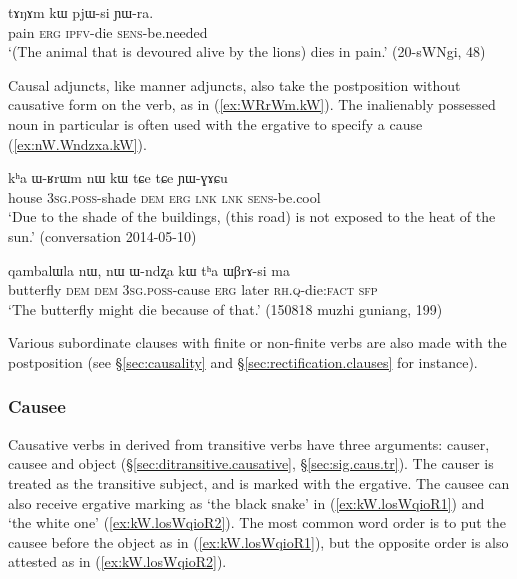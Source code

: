 \begin{exe}
\ex \label{ex:tANAm.kW.pjWsi}
 \gll tɤŋɤm kɯ pjɯ-si ɲɯ-ra. \\
 pain \textsc{erg} \textsc{ipfv}-die \textsc{sens}-be.needed \\
 \glt `(The animal that is devoured alive by the lions) dies in pain.' (20-sWNgi, 48)
\end{exe}

Causal adjuncts, like manner adjuncts, also take the postposition  without causative form on the verb, as in (\ref{ex:WRrWm.kW}). The inalienably possessed noun  in particular is often used with the ergative to specify a cause  (\ref{ex:nW.Wndzxa.kW}). 

\begin{exe}
\ex \label{ex:WRrWm.kW}
 \gll   kʰa ɯ-ʁrɯm nɯ kɯ tɕe tɕe ɲɯ-ɣɤɕu \\
house \textsc{3sg}.\textsc{poss}-shade \textsc{dem} \textsc{erg} \textsc{lnk} \textsc{lnk}  \textsc{sens}-be.cool \\
\glt `Due to the shade of the buildings, (this road) is not exposed to the heat of the sun.' (conversation 2014-05-10)
\end{exe}

 \begin{exe}
\ex \label{ex:nW.Wndzxa.kW}
 \gll   qambalɯla nɯ, nɯ ɯ-ndʐa kɯ tʰa ɯβrɤ-si ma \\
 butterfly \textsc{dem} \textsc{dem} \textsc{3sg}.\textsc{poss}-cause \textsc{erg}  later \textsc{rh}.\textsc{q}-die:\textsc{fact} \textsc{sfp} \\
 \glt `The butterfly might die because of that.' (150818 muzhi guniang, 199)
\end{exe}
 

Various subordinate clauses with finite or non-finite verbs are also made with the postposition  (see §\ref{sec:causality} and §\ref{sec:rectification.clauses} for instance).

\subsubsection{Causee} \label{sec:causee.kW}
Causative verbs in  derived from transitive verbs have three arguments: causer, causee and object (§\ref{sec:ditransitive.causative}, §\ref{sec:sig.caus.tr}). The causer is treated as the transitive subject, and is marked with the ergative. The causee can also receive  ergative marking as  `the black snake' in (\ref{ex:kW.losWqioR1}) and  `the white one' (\ref{ex:kW.losWqioR2}). The most common word order is to put the causee before the object as in (\ref{ex:kW.losWqioR1}), but the opposite order is also attested as in (\ref{ex:kW.losWqioR2}).

